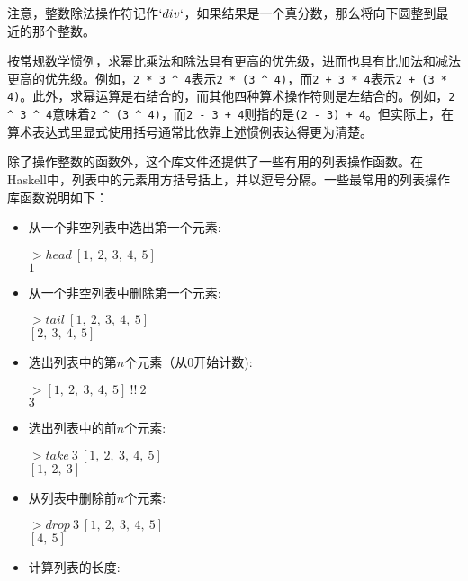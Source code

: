 注意，整数除法操作符记作$`div`$，如果结果是一个真分数，那么将向下圆整到最近的那个整数。

按常规数学惯例，求幂比乘法和除法具有更高的优先级，进而也具有比加法和减法更高的优先级。例如，\verb|2 * 3 ^ 4|表示\verb|2 * (3 ^ 4)|，而\verb|2 + 3 * 4|表示\verb|2 + (3 * 4)|。此外，求幂运算是右结合的，而其他四种算术操作符则是左结合的。例如，\verb|2 ^ 3 ^ 4|意味着\verb|2 ^ (3 ^ 4)|，而\verb|2 - 3 + 4|则指的是\verb|(2 - 3) + 4|。但实际上，在算术表达式里显式使用括号通常比依靠上述惯例表达得更为清楚。 

除了操作整数的函数外，这个库文件还提供了一些有用的列表操作函数。在Haskell中，列表中的元素用方括号括上，并以逗号分隔。一些最常用的列表操作库函数说明如下：

\begin{itemize}
\item 从一个非空列表中选出第一个元素:

\noindent\hspace*{1cm} $> head~[1,~2,~3,~4,~5]$\\
\hspace*{1cm} $1$

\item 从一个非空列表中删除第一个元素:

\noindent\hspace*{1cm} $> tail~[1,~2,~3,~4,~5]$\\
\hspace*{1cm} $[2,~3,~4,~5]$

\item 选出列表中的第$n$个元素（从0开始计数):

\noindent\hspace*{1cm} $> [1,~2,~3,~4,~5]~!!~2$\\
\hspace*{1cm} $3$

\item 选出列表中的前$n$个元素:

\noindent\hspace*{1cm} $> take~3~[1,~2,~3,~4,~5]$\\
\hspace*{1cm} $[1,~2,~3]$

\item 从列表中删除前$n$个元素:

\noindent\hspace*{1cm} $> drop~3~[1,~2,~3,~4,~5]$\\
\hspace*{1cm} $[4,~5]$

\item 计算列表的长度:


\end{itemize}
